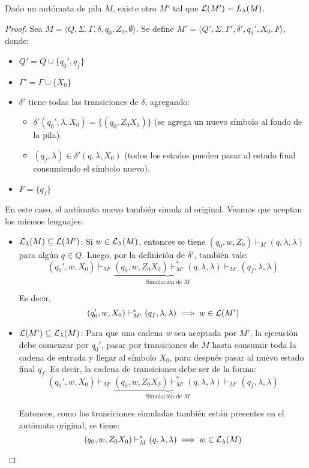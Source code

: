 \begin{theorem*}
    Dado un autómata de pila $M$, existe otro $M'$ tal que $\mathcal{L}(M') = L_\lambda(M)$.
\end{theorem*}
\begin{proof}
    Sea $M = \langle Q, \Sigma, \Gamma, \delta, q_0, Z_0, \emptyset \rangle$. Se define $M' = \langle Q', \Sigma, \Gamma', \delta', q_0', X_0, F \rangle$, donde:
    \begin{itemize}
        \item $Q' = Q \cup \{q_0', q_f\}$
        \item $\Gamma' = \Gamma \cup \{X_0\}$
        \item $\delta'$ tiene todas las transiciones de $\delta$, agregando:
        \begin{itemize}
            \item $\delta'(q_0', \lambda, X_0) = \{(q_0, Z_0 X_0)\}$ (se agrega un nuevo símbolo al fondo de la pila).
            \item $(q_f, \lambda) \in \delta'(q, \lambda, X_0)$ (todos los estados pueden pasar al estado final consumiendo el símbolo nuevo).
        \end{itemize}
        \item $F = \{q_f\}$
    \end{itemize}

    En este caso, el autómata nuevo también simula al original. Veamos que aceptan los mismos lenguajes:
    \begin{itemize}
        \item $\mathcal{L}_\lambda(M) \subseteq \mathcal{L}(M')$: Si $w \in \mathcal{L}_\lambda(M)$, entonces se tiene $(q_0, w, Z_0) \vdash_M (q, \lambda, \lambda)$ para algún $q \in Q$. Luego, por la definición de $\delta'$, también vale:
        $$
            (q_0', w, X_0) \vdash_{M'} \underbrace{(q_0, w, Z_0 X_0) \vdash_{M'}^* (q, \lambda, \lambda)}_{\text{Simulación de } M} \vdash_{M'} (q_f, \lambda, \lambda)
        $$

        Es decir,
        $$
            (q_0', w, X_0) \vdash_{M'}^* (q_f, \lambda, \lambda) \implies w \in \mathcal{L}(M')
        $$
        \item $\mathcal{L}(M') \subseteq \mathcal{L}_\lambda(M)$: Para que una cadena $w$ sea aceptada por $M'$, la ejecución debe comenzar por $q_0'$, pasar por transiciones de $M$ hasta consumir toda la cadena de entrada y llegar al símbolo $X_0$, para después pasar al nuevo estado final $q_f$. Es decir, la cadena de transiciones debe ser de la forma:
        $$
            (q_0', w, X_0) \vdash_{M'} \underbrace{(q_0, w, Z_0 X_0) \vdash_{M'}^* (q, \lambda, \lambda)}_{\text{Simulación de } M} \vdash_{M'} (q_f, \lambda, \lambda)
        $$

        Entonces, como las transiciones simuladas también están presentes en el autómata original, se tiene:
        $$
            (q_0, w, Z_0 X_0) \vdash_M^* (q, \lambda, \lambda) \implies w \in \mathcal{L}_\lambda(M)
        $$
    \end{itemize}
\end{proof}
